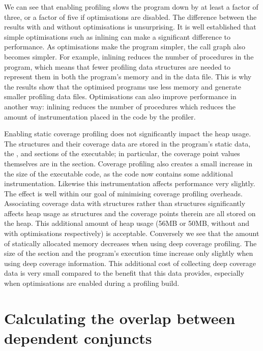 We can see that enabling profiling slows the program down by at least a
factor of three,
or a factor of five if optimisations are disabled.
The difference between the results with and without optimisations is
unsurprising.
It is well established that simple optimisations such as inlining can make a
significant difference to performance.
As optimisations make the program simpler, the call graph also becomes
simpler.
For example, inlining reduces the number of procedures in the program,
which means that fewer profiling data structures are needed to represent
them in both the program's memory and in the data file.
This is why the results show that the optimised programs use less memory
and generate smaller profiling data files.
Optimisations can also improve performance in another way:
inlining reduces the number of procedures which reduces the amount of
instrumentation placed in the code by the profiler.

Enabling static coverage profiling does not significantly impact the heap 
usage.
The \PS structures and their coverage data are stored in the program's
static data,
the ,  and  sections of the executable;
in particular, the coverage point values themselves are in the 
section.
Coverage profiling also creates a small increase in the size of the
executable code, as the code now contains some additional instrumentation.
Likewise this instrumentation affects performance very slightly.
The effect is well within our goal of minimising coverage profiling
overheads.
Associating coverage data with \PD structures rather than \PS structures
significantly affects heap usage as \PD structures and the coverage points
therein are all stored on the heap.
This additional amount of heap usage (56MB or 50MB,
without and with optimisations respectively)
is acceptable.
Conversely we see that the amount of statically allocated memory decreases
when using deep coverage profiling.
The size of the  section and the program's execution time
increase only slightly when using deep coverage information.
This additional cost of collecting deep coverage data is very small compared
to the benefit that this data provides,
especially when optimisations are enabled during a profiling build.


\section{Calculating the overlap between dependent conjuncts}
\label{sec:overlap_overlap_alg}

